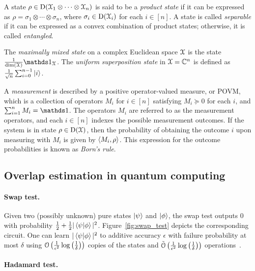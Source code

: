 A state $\rho \in \mathrm{D}(\mathcal{X}_1 \otimes \cdots \otimes \mathcal{X}_n)$ is said to be a \emph{product state} if it can be expressed as
$\rho = \sigma_1 \otimes \cdots \otimes \sigma_n$, where $\sigma_i \in \mathrm{D}(\mathcal{X}_i)$ for each $i \in [n]$. 
A state is called \emph{separable} if it can be expressed as a convex combination of product states; otherwise, it is called \emph{entangled}.

The \emph{maximally mixed state} on a complex Euclidean space $\mathcal{X}$ is the state $\frac{1}{\dim(\X)} \id_\X$.
The \emph{uniform superposition state} in $\mathcal{X} = \mathbb{C}^n$ is defined as $\frac{1}{\sqrt{n}} \sum_{i=0}^{n-1} \ket{i}$.

A \emph{measurement} is described by a positive operator-valued measure, or POVM, which is a collection of operators $M_i$ for $i \in [n]$ satisfying $M_i \succcurlyeq 0$ for each $i$, and $\sum_{i = 1}^n M_i = \id$.
The operators $M_i$ are referred to as the measurement operators, and each $i \in [n]$ indexes the possible measurement outcomes. 
If the system is in state $\rho \in \mathrm{D}(\mathcal{X})$, then the probability of obtaining the outcome $i$ upon measuring with $M_i$ is given by $\left\langle M_i, \rho \right\rangle$.
This expression for the outcome probabilities is known as \emph{Born's rule}.

\subsection{Overlap estimation in quantum computing}\label{sec:QC_bg} 

\paragraph{Swap test.}

Given two (possibly unknown) pure states $\ket{\psi}$ and $\ket{\phi}$, the swap test outputs $0$ with probability $\frac{1}{2} + \frac{1}{2}|\braket{\psi}{\phi}|^2$.
Figure~\ref{fig:swap_test} depicts the corresponding circuit.
One can learn $|\braket{\psi}{\phi}|^2$ to additive accuracy $\epsilon$ with failure probability at most $\delta$ using $\mathcal{O} \left(\frac{1}{\epsilon^2} \log \left( \frac{1}{\delta} \right) \right)$ copies of the states and $\tilde{\mathcal{O}} \left(\frac{1}{\epsilon^2} \log \left( \frac{1}{\delta} \right) \right)$ operations~\cite{buhrman2001quantum,huang2019near}.

\paragraph{Hadamard test.}

